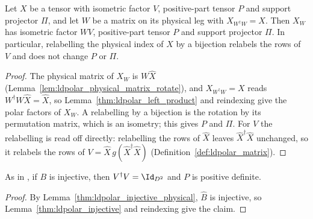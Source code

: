 \begin{lemma}
    \label{thm:ldpolar_tensor_rotate}
    \leanok
    Let $X$ be a tensor with isometric factor $V$, positive-part tensor $P$ and
    support projector $\Pi$, and let $W$ be a matrix on its physical leg with
    $X_{W^\dagger W}=X$. Then $X_W$ has isometric factor $WV$, positive-part
    tensor $P$ and support projector $\Pi$. In particular, relabelling the
    physical index of $X$ by a bijection relabels the rows of $V$ and does not
    change $P$ or $\Pi$.
\end{lemma}
\begin{proof}
    \leanok
    The physical matrix of $X_W$ is $W\widehat X$
    (Lemma~\ref{lem:ldpolar_physical_matrix_rotate}), and $X_{W^\dagger W}=X$
    reads $W^\dagger W\widehat X=\widehat X$, so
    Lemma~\ref{thm:ldpolar_left_product} and reindexing give the polar factors
    of $X_W$. A relabelling by a
    bijection is the rotation by its permutation matrix, which is an isometry;
    this gives $P$ and $\Pi$. For $V$ the relabelling is read off directly:
    relabelling the rows of $\widehat X$ leaves $\widehat X^\dagger\widehat X$
    unchanged, so it relabels the rows of
    $V=\widehat X\,g(\widehat X^\dagger\widehat X)$
    (Definition~\ref{def:ldpolar_matrix}).
\end{proof}

\begin{lemma}
    \label{thm:ldpolar_tensor_injective}
    \leanok
    As in \cite[eq.~(8)]{Malz2024Preparation}, if $B$ is injective, then
    $V^\dagger V=\Id_{D^2}$ and $P$ is positive definite.
\end{lemma}
\begin{proof}
    \leanok
    By Lemma~\ref{thm:ldpolar_injective_physical}, $\widehat B$ is
    injective, so Lemma~\ref{thm:ldpolar_injective} and reindexing give the
    claim.
\end{proof}

